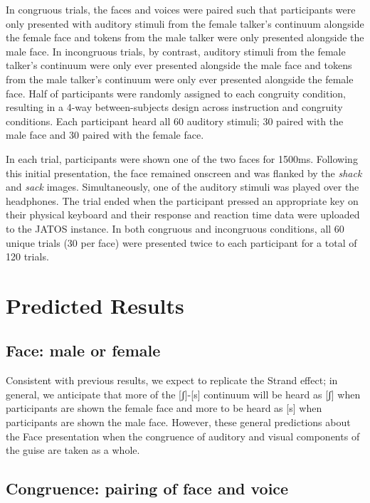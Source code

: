 \documentclass[
  letterpaper,
  DIV=11,
  numbers=noendperiod]{scrartcl}
\begin{document}
In congruous trials, the faces and voices were paired such that
participants were only presented with auditory stimuli from the female
talker's continuum alongside the female face and tokens from the male
talker were only presented alongside the male face. In incongruous
trials, by contrast, auditory stimuli from the female talker's continuum
were only ever presented alongside the male face and tokens from the
male talker's continuum were only ever presented alongside the female
face. Half of participants were randomly assigned to each congruity
condition, resulting in a 4-way between-subjects design across
instruction and congruity conditions. Each participant heard all 60
auditory stimuli; 30 paired with the male face and 30 paired with the
female face.

In each trial, participants were shown one of the two faces for 1500ms.
Following this initial presentation, the face remained onscreen and was
flanked by the \emph{shack} and \emph{sack} images. Simultaneously, one
of the auditory stimuli was played over the headphones. The trial ended
when the participant pressed an appropriate key on their physical
keyboard and their response and reaction time data were uploaded to the
JATOS instance. In both congruous and incongruous conditions, all 60
unique trials (30 per face) were presented twice to each participant for
a total of 120 trials.

\section{Predicted Results}\label{sec-predictions}

\subsection{Face: male or female}\label{sub-pred-face}

Consistent with previous results, we expect to replicate the Strand
effect; in general, we anticipate that more of the {[}ʃ{]}-{[}s{]}
continuum will be heard as {[}ʃ{]} when participants are shown the
female face and more to be heard as {[}s{]} when participants are shown
the male face. However, these general predictions about the Face
presentation when the congruence of auditory and visual components of
the guise are taken as a whole.

\subsection{Congruence: pairing of face and
voice}\label{sub-pred-congruence}
\end{document}
